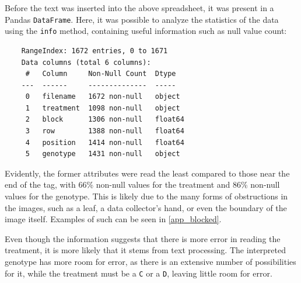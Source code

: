 \documentclass[final,5p,times,twocolumn,authoryear]{elsarticle}
\begin{document}
\begin{center}
\label{Table1}
\end{center}

Before the text was inserted into the above spreadsheet, it was present in a Pandas \verb|DataFrame|. Here, it was possible to analyze the statistics of the data using the \verb|info| method, containing useful information such as null value count:

\begin{verbatim}
    RangeIndex: 1672 entries, 0 to 1671
    Data columns (total 6 columns):
     #   Column     Non-Null Count  Dtype  
    ---  ------     --------------  -----  
     0   filename   1672 non-null   object 
     1   treatment  1098 non-null   object 
     2   block      1306 non-null   float64
     3   row        1388 non-null   float64
     4   position   1414 non-null   float64
     5   genotype   1431 non-null   object 
\end{verbatim}

Evidently, the former attributes were read the least compared to those near the end of the tag, with 66\% non-null values for the treatment and 86\% non-null values for the genotype. This is likely due to the many forms of obstructions in the images, such as a leaf, a data collector's hand, or even the boundary of the image itself. Examples of such can be seen in \ref{app_blocked}.

Even though the information suggests that there is more error in reading the treatment, it is more likely that it stems from text processing. The interpreted genotype has more room for error, as there is an extensive number of possibilities for it, while the treatment must be a \verb|C| or a \verb|D|, leaving little room for error.
\end{document}

